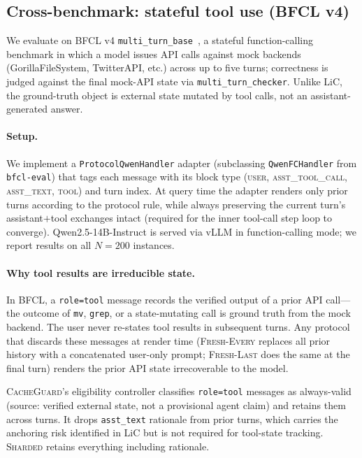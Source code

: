 \documentclass{article}
\begin{document}
\subsection{Cross-benchmark: stateful tool use (BFCL v4)}
\label{sec:bfcl}

We evaluate on BFCL v4 \texttt{multi\_turn\_base}~\citep{yan2024bfcl}, a stateful function-calling benchmark in which a model issues API calls against mock backends (GorillaFileSystem, TwitterAPI, etc.) across up to five turns; correctness is judged against the final mock-API state via \texttt{multi\_turn\_checker}. Unlike LiC, the ground-truth object is external state mutated by tool calls, not an assistant-generated answer.

\paragraph{Setup.}
We implement a \texttt{ProtocolQwenHandler} adapter (subclassing \texttt{QwenFCHandler} from \texttt{bfcl-eval}) that tags each message with its block type (\textsc{user}, \textsc{asst\_tool\_call}, \textsc{asst\_text}, \textsc{tool}) and turn index. At query time the adapter renders only prior turns according to the protocol rule, while always preserving the current turn's assistant$+$tool exchanges intact (required for the inner tool-call step loop to converge). Qwen2.5-14B-Instruct is served via vLLM in function-calling mode; we report results on all $N=200$ instances.

\paragraph{Why tool results are irreducible state.}
In BFCL, a \texttt{role=tool} message records the verified output of a prior API call---the outcome of \texttt{mv}, \texttt{grep}, or a state-mutating call is ground truth from the mock backend. The user never re-states tool results in subsequent turns. Any protocol that discards these messages at render time (\textsc{Fresh-Every} replaces all prior history with a concatenated user-only prompt; \textsc{Fresh-Last} does the same at the final turn) renders the prior API state irrecoverable to the model.

\textsc{CacheGuard}'s eligibility controller classifies \texttt{role=tool} messages as always-valid (source: verified external state, not a provisional agent claim) and retains them across turns. It drops \texttt{asst\_text} rationale from prior turns, which carries the anchoring risk identified in LiC but is not required for tool-state tracking. \textsc{Sharded} retains everything including rationale.
\end{document}
